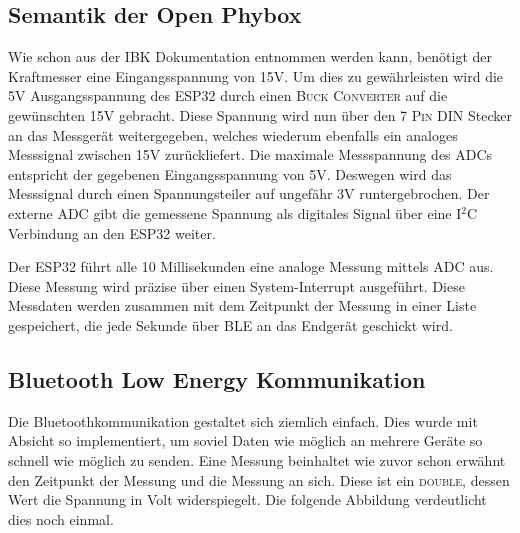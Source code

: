 \clearpage

\subsection{Semantik der Open Phybox}
\label{sec:Semantik der Open Phybox}

\begin{figure}[htb]
    \centering
\end{figure}

Wie schon aus der \ac{IBK} Dokumentation entnommen werden kann, benötigt der Kraftmesser eine Eingangsspannung von \textpm 15V. Um dies zu gewährleisten wird die 5V Ausgangsspannung des \ac{ESP32} durch einen \textsc{Buck Converter} auf die gewünschten \textpm 15V gebracht. Diese Spannung wird nun über den \textsc{7 Pin DIN} Stecker an das Messgerät weitergegeben, welches wiederum ebenfalls ein analoges Messsignal zwischen \textpm 15V zurückliefert. Die maximale Messspannung des \acp{ADC} entspricht der gegebenen Eingangsspannung von \textsc{5}V. Deswegen wird das Messsignal durch einen Spannungsteiler auf ungefähr \textpm \textsc{3V} runtergebrochen. Der externe \ac{ADC} gibt die gemessene Spannung als digitales Signal über eine I$^{2}$C Verbindung an den \ac{ESP32} weiter.

Der \ac{ESP32} führt alle 10 Millisekunden eine analoge Messung mittels \ac{ADC} aus. Diese Messung wird präzise über einen System-Interrupt ausgeführt. Diese Messdaten werden zusammen mit dem Zeitpunkt der Messung in einer Liste gespeichert, die jede Sekunde über \ac{BLE} an das Endgerät geschickt wird.

\clearpage

\subsection{Bluetooth Low Energy Kommunikation}
\label{sec:Bluetooth Low Energy Kommunikation}

Die Bluetoothkommunikation gestaltet sich ziemlich einfach. Dies wurde mit Absicht so implementiert, um soviel Daten wie möglich an mehrere Geräte so schnell wie möglich zu senden.
Eine Messung beinhaltet wie zuvor schon erwähnt den Zeitpunkt der Messung und die Messung an sich. Diese ist ein \textsc{double}, dessen Wert die Spannung in Volt widerspiegelt. Die folgende Abbildung verdeutlicht dies noch einmal.

\begin{figure}[htb]
    \centering
\end{figure}

